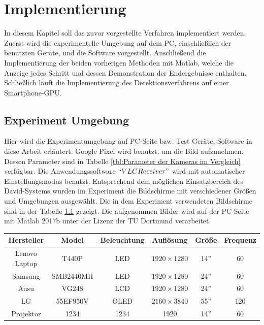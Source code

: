 \chapter{Implementierung} \label{cha:Implementierung}

In diesem Kapitel soll das zuvor vorgestellte Verfahren implementiert werden. Zuerst wird die experimentelle Umgebung auf dem PC, einschließlich der benutzten Geräte, und die Software vorgestellt. Anschließend die Implementierung der beiden vorherigen Methoden mit Matlab, welche die Anzeige jedes Schritt und dessen Demonstration der Endergebnisse enthalten. Schließlich läuft die Implementierung des Detektionsverfahrens auf einer Smartphone-GPU.

\section{Experiment Umgebung}

Hier wird die Experimentumgebung auf PC-Seite bzw. Test Geräte, Software in diese Arbeit erläutert. Google Pixel wird benutzt, um die Bild aufzunehmen. Dessen Parameter sind in Tabelle \ref{tbl:Parameter der Kameras im Vergleich} verfügbar. Die Anwendungssoftware $ ``VLCReceiver" $ wird mit automatischer Einstellungsmodus benutzt. Entsprechend dem möglichen Einsatzbereich des David-Systems wurden im Experiment die Bildschirme mit verschiedener Größen und Umgebungen ausgewählt. Die in dem Experiment verwendeten Bildschirme sind in der Tabelle \ref{tbl:Verwendeter Bildschirm} gezeigt. Die aufgenommen Bilder wird auf der PC-Seite mit Matlab 2017b unter der Lizenz der TU Dortmund verarbeitet.

\begin{table}[htb]
	\label{tbl:Verwendeter Bildschirm}
	\footnotesize
	\centering
	\begin{tabular}{|c|c|c|c|c|c|}
	\toprule
	\textbf{Hersteller} & \textbf{Model} & \textbf{Beleuchtung} & \textbf{Auflösung} & \textbf{Größe}	& \textbf{Frequenz}\\
	\midrule
	Lenovo Laptop & T440P & LED & $ 1920 \times 1280$ & 14'' & 60 \\
	Samsung 	  & SMB2440MH   & LED & $ 1920 \times 1280$ & 24'' & 60 \\
	Ausu  		  & VG248   & LCD & $ 1920 \times 1280$ & 24'' & 60 \\
	LG  		  & 55EF950V & OLED & $ 2160 \times 3840$ & 55'' & 120 \\
	 Projektor & 1234 & 1234 & 1920 & 14'' & 60 \\
	
	\bottomrule
	\end{tabular}
\end{table} 

